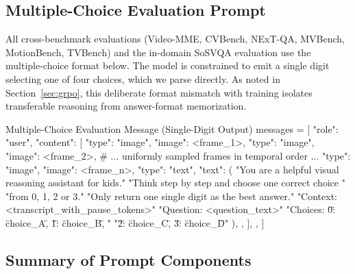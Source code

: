 \documentclass{article}
\begin{document}
\subsection{Multiple-Choice Evaluation Prompt}
 
All cross-benchmark evaluations (Video-MME, CVBench, NExT-QA, MVBench,
MotionBench, TVBench) and the in-domain SoSVQA evaluation use the
multiple-choice format below. The model is constrained to emit a single
digit selecting one of four choices, which we parse directly. As noted in
Section~\ref{sec:grpo}, this deliberate format mismatch with training
isolates transferable reasoning from answer-format memorization.
 
\begin{promptbox}{Multiple-Choice Evaluation Message (Single-Digit Output)}
messages = [
    {
        "role": "user",
        "content": [
            {"type": "image", "image": <frame_1>},
            {"type": "image", "image": <frame_2>},
            # ... uniformly sampled frames in temporal order ...
            {"type": "image", "image": <frame_n>},
            {
                "type": "text",
                "text": (
                    "You are a helpful visual reasoning assistant for kids.\n"
                    "Think step by step and choose one correct choice "
                    "from 0, 1, 2 or 3.\n"
                    "Only return one single digit as the best answer.\n"
                    "Context: <transcript_with_pause_tokens>\n"
                    "Question: <question_text>\n"
                    "Choices: {\"0\": \"choice_A\", \"1\": \"choice_B\", "
                    "\"2\": \"choice_C\", \"3\": \"choice_D\"}"
                ),
            },
        ],
    },
]
\end{promptbox}
 
\subsection{Summary of Prompt Components}
 
\end{document}
